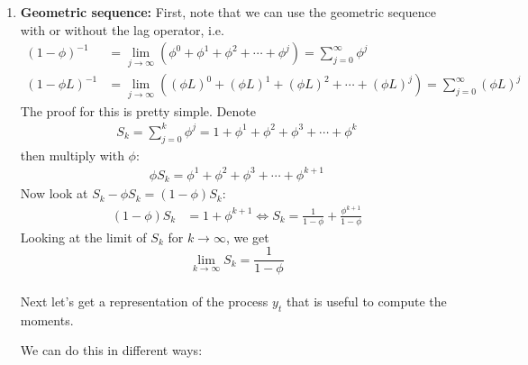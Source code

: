 \begin{enumerate}

\item \textbf{Geometric sequence:} First, note that we can use the geometric sequence with or without the lag operator, i.e.
\begin{align*}
{(1-\phi)}^{-1} &= \lim\limits_{j\rightarrow \infty}(\phi^0 + \phi^1 + \phi^2 + \cdots + \phi^j) = \sum_{j=0}^\infty \phi^j
\\
{(1-\phi L)}^{-1} &= \lim\limits_{j\rightarrow \infty}({(\phi L)}^0 + {(\phi L)}^1 + {(\phi L)}^2 + \cdots + {(\phi L)}^j) = \sum_{j=0}^\infty {(\phi L)}^j
\end{align*}
The proof for this is pretty simple. Denote
\begin{align*}
S_{k} =	\sum_{j=0}^{k} \phi^j =	1 + \phi^1 + \phi^2 + \phi^3 + \cdots + \phi^k
\end{align*}
then multiply with \(\phi\):
\begin{align*}
\phi S_k = \phi^1 + \phi^2 + \phi^3 + \cdots + \phi^{k+1}
\end{align*}
Now look at \(S_k - \phi S_k = (1 - \phi) S_{k}\):
\begin{align*}
(1-\phi) S_{k} &= 1 + \phi^{k+1}
\Leftrightarrow
S_{k}	= \frac{1}{1 - \phi} + \frac{\phi^{k+1}}{1-\phi}
\end{align*} 
Looking at the limit of \(S_{k}\) for \(k \to \infty \), we get
\[\lim\limits_{k \to \infty} S_{k} = \frac{1}{1 - \phi}\]
\\
Next let's get a representation of the process \(y_t\) that is useful to compute the moments.

We can do this in different ways:
    \begin{itemize}


\end{itemize}
\end{enumerate}
